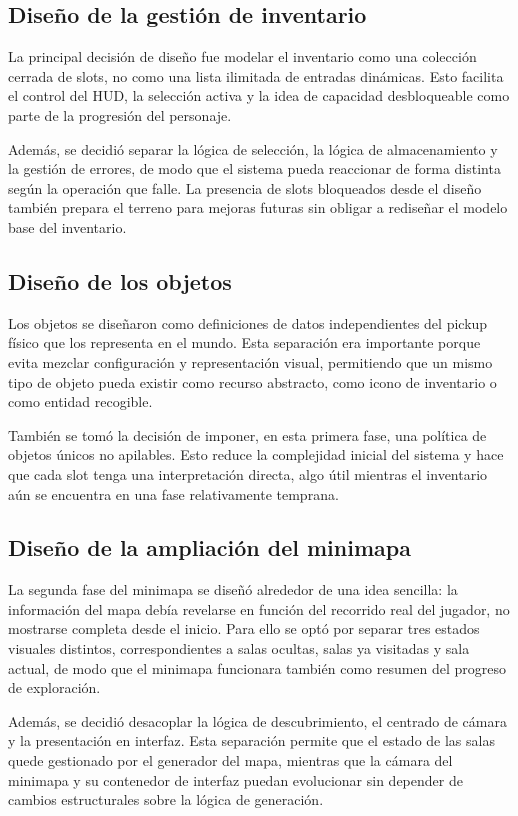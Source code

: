 \subsection{Diseño de la gestión de inventario}
La principal decisión de diseño fue modelar el inventario como una colección cerrada de
slots, no como una lista ilimitada de entradas dinámicas. Esto facilita el control del HUD,
la selección activa y la idea de capacidad desbloqueable como parte de la progresión del
personaje.

Además, se decidió separar la lógica de selección, la lógica de almacenamiento y la gestión
de errores, de modo que el sistema pueda reaccionar de forma distinta según la operación que
falle. La presencia de slots bloqueados desde el diseño también prepara el terreno para
mejoras futuras sin obligar a rediseñar el modelo base del inventario.

\subsection{Diseño de los objetos}
Los objetos se diseñaron como definiciones de datos independientes del pickup físico que los
representa en el mundo. Esta separación era importante porque evita mezclar configuración y
representación visual, permitiendo que un mismo tipo de objeto pueda existir como recurso
abstracto, como icono de inventario o como entidad recogible.

También se tomó la decisión de imponer, en esta primera fase, una política de objetos
únicos no apilables. Esto reduce la complejidad inicial del sistema y hace que cada slot
tenga una interpretación directa, algo útil mientras el inventario aún se encuentra en una
fase relativamente temprana.

\subsection{Diseño de la ampliación del minimapa}
La segunda fase del minimapa se diseñó alrededor de una idea sencilla: la información del
mapa debía revelarse en función del recorrido real del jugador, no mostrarse completa desde
el inicio. Para ello se optó por separar tres estados visuales distintos, correspondientes a
salas ocultas, salas ya visitadas y sala actual, de modo que el minimapa funcionara también
como resumen del progreso de exploración.

Además, se decidió desacoplar la lógica de descubrimiento, el centrado de cámara y la
presentación en interfaz. Esta separación permite que el estado de las salas quede
gestionado por el generador del mapa, mientras que la cámara del minimapa y su contenedor de
interfaz puedan evolucionar sin depender de cambios estructurales sobre la lógica de
generación.

